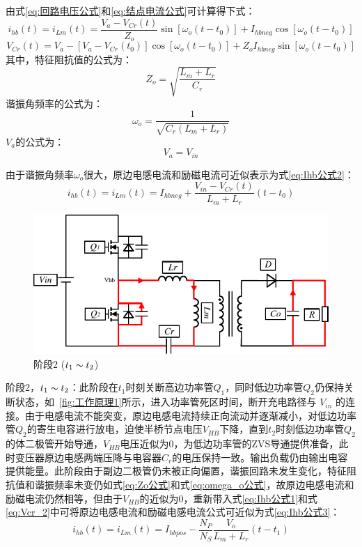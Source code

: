 由式\eqref{eq:回路电压公式}和\eqref{eq:结点电流公式}可计算得下式：
\begin{equation}
    \label{eq:Ihb公式1}
    i_{hb}(t) = i_{Lm}(t) = \frac{V_{a}-V_{Cr}(t)}{Z_o}\sin[\omega_o(t-t_0)] + I_{hbneg}\cos[\omega_o(t-t_0)]  
\end{equation}
\begin{equation}
    \label{eq:Vcr_2}
    V_{Cr}(t) =V_{a}-[V_{a}-V_{Cr}(t_0)]\cos[\omega_o(t-t_0)] + {Z_o} I_{hbneg} \sin[\omega_o(t-t_0)]
\end{equation}
其中，特征阻抗值的公式为：
\begin{equation}
    \label{eq:Zo公式}
    Z_o=\sqrt{\frac{L_m+L_r}{C_r}}  
\end{equation}
谐振角频率的公式为：
\begin{equation}
    \label{eq:omega_o公式}
    \omega_o=\frac{1}{\sqrt{C_r(L_m+L_r)}}
\end{equation}
$V_{a}$的公式为：
\begin{equation}
    \label{eq:Vhb公式1}
    V_{a}=V_{in}
\end{equation}

由于谐振角频率$\omega_o$很大，原边电感电流和励磁电流可近似表示为式\eqref{eq:Ihb公式2}：
\begin{equation}
    \label{eq:Ihb公式2}
    i_{hb}(t) = i_{Lm}(t) = I_{hbneg} + \frac{V_{in}-V_{Cr}(t)}{L_m + L_r}(t-t_0)
\end{equation}


\begin{figure}[htbp] 
    \centering
    \includegraphics[width=0.8\linewidth]{figures/工作原理2.pdf}
    \caption{阶段2 ($t_1 \thicksim t_2$)}
    \label{fig:工作原理2}
\end{figure}
                
阶段2，$t_1 \thicksim t_2$：此阶段在$t_1$时刻关断高边功率管$Q_1$，同时低边功率管$Q_2$仍保持关断状态，如~\ref{fig:工作原理1}所示，进入功率管死区时间，断开充电路径与 $V_{in}$ 的连接。由于电感电流不能突变，原边电感电流持续正向流动并逐渐减小，对低边功率管$Q_2$的寄生电容进行放电，迫使半桥节点电压$V_{HB}$下降，直到$t_2$时刻低边功率管$Q_2$的体二极管开始导通，$V_{HB}$电压近似为0，为低边功率管的ZVS导通提供准备，此时变压器原边电感两端压降与电容器$C_r$的电压保持一致。输出负载仍由输出电容提供能量。此阶段由于副边二极管仍未被正向偏置，谐振回路未发生变化，特征阻抗值和谐振频率未变仍如式\eqref{eq:Zo公式}和式\eqref{eq:omega_o公式}，故原边电感电流和励磁电流仍然相等，但由于$V_{HB}$的近似为0，重新带入式\eqref{eq:Ihb公式1}和式\eqref{eq:Vcr_2}中可将原边电感电流和励磁电感电流公式可近似为式\eqref{eq:Ihb公式3}：
\begin{equation}
    \label{eq:Ihb公式3}
    i_{hb}(t) = i_{Lm}(t) = I_{hbpos} - \frac{N_P}{N_S} \frac{V_o}{L_m + L_r}(t-t_1)
\end{equation}

